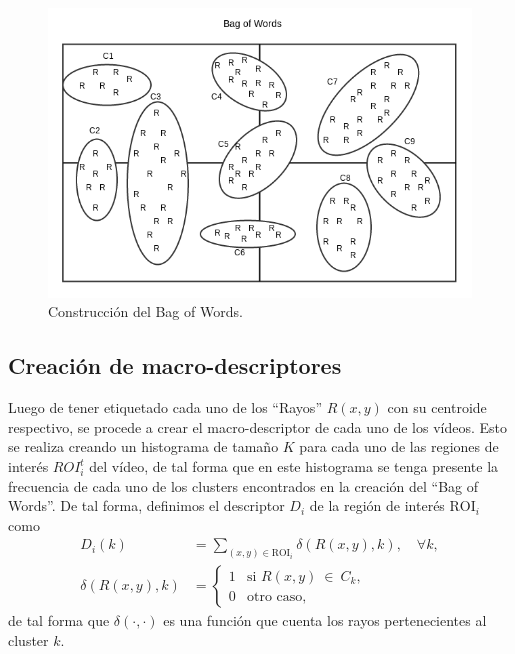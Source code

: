 	\begin{figure}[tb]
		\centering
    		\includegraphics[width=1\textwidth]{Figuras/Diagramas/bow_solo.png}
  		\caption{Construcción del Bag of Words.}
  		\label{algoritmo:fig:bow}
	\end{figure}	

	\subsection{Creación de macro-descriptores}
	\label{algoritmo:crea_macro-descriptores}
	Luego de tener etiquetado cada uno de los ``Rayos'' $R(x,y)$ con su centroide respectivo, se procede a crear el macro-descriptor de cada uno de los vídeos.	 Esto se realiza creando un histograma de tamaño $K$ para cada uno de las regiones de interés ${ROI}_{i}^{t}$ del vídeo, de tal forma que en este histograma se tenga presente la frecuencia de cada uno de los clusters encontrados en la creación del ``Bag of Words''. De tal forma, definimos el descriptor $D_i$ de la región de interés $\text{ROI}_i$ como
	\begin{align}
		\label{algoritmo:eq:hist}
		D_i(k) &= \sum_{(x,y)\in \text{ROI}_i} \delta (R(x,y),k), \quad \forall k,\\
		\label{algoritmo:eq:fun_hist}
		 \delta (R(x,y),k) &= \begin{cases}
		 1 & \mbox{si }R(x,y)~\in~C_k,\\
     0 & \text{otro caso},
     \end{cases}
	\end{align}
de tal forma que $\delta(\cdot,\cdot)$ es una función que cuenta los rayos pertenecientes al cluster $k$.

